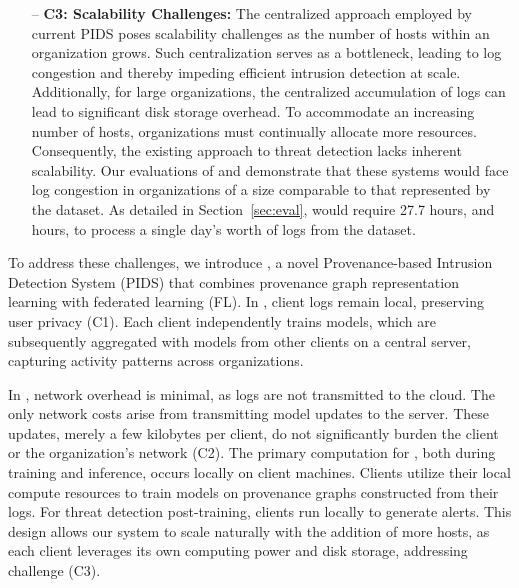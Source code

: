 \begin{itemize} [leftmargin=*]
    \item[--] \textbf{C3: Scalability Challenges:} The centralized approach employed by current PIDS poses scalability challenges as the number of hosts within an organization grows. Such centralization serves as a bottleneck, leading to log congestion and thereby impeding efficient intrusion detection at scale. Additionally, for large organizations, the centralized accumulation of logs can lead to significant disk storage overhead. To accommodate an increasing number of hosts, organizations must continually allocate more resources. Consequently, the existing approach to threat detection lacks inherent scalability. Our evaluations of \flash and \kairos demonstrate that these systems would face log congestion in organizations of a size comparable to that represented by the \optc dataset. As detailed in Section~\ref{sec:eval}, \flash would require 27.7 hours, and  hours, to process a single day's worth of logs from the \optc dataset.
    
\end{itemize}


To address these challenges, we introduce \Sys, a novel Provenance-based Intrusion Detection System (PIDS) that combines provenance graph representation learning with federated learning (FL). In \Sys, client logs remain local, preserving user privacy (C1). Each client independently trains \gnnshort models, which are subsequently aggregated with models from other clients on a central server, capturing activity patterns across organizations.

In \Sys, network overhead is minimal, as logs are not transmitted to the cloud. The only network costs arise from transmitting model updates to the server. These updates, merely a few kilobytes per client, do not significantly burden the client or the organization's network (C2). The primary computation for \Sys, both during training and inference, occurs locally on client machines. Clients utilize their local compute resources to train models on provenance graphs constructed from their logs. For threat detection post-training, clients run \Sys locally to generate alerts. This design allows our system to scale naturally with the addition of more hosts, as each client leverages its own computing power and disk storage, addressing challenge (C3).


